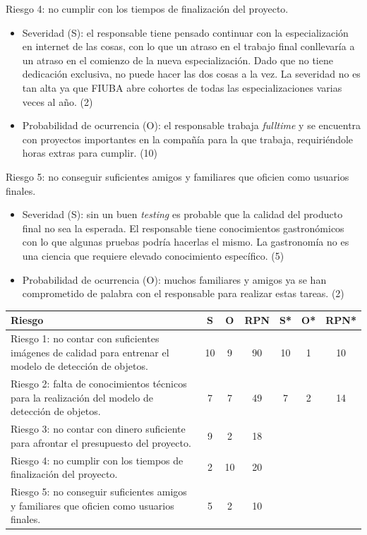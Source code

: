 \documentclass[
11pt, %
]{charter}
\begin{document}
Riesgo 4: no cumplir con los tiempos de finalización del proyecto.
\begin{itemize}
\item Severidad (S): el responsable tiene pensado continuar con la especialización en internet de las cosas, con lo que un atraso en el trabajo final conllevaría a un atraso en el comienzo de la nueva especialización. Dado que no tiene dedicación exclusiva, no puede hacer las dos cosas a la vez. La severidad no es tan alta ya que FIUBA abre cohortes de todas las especializaciones varias veces al año. (2)
\item Probabilidad de ocurrencia (O): el responsable trabaja \textit{fulltime} y se encuentra con proyectos importantes en la compañía para la que trabaja, requiriéndole horas extras para cumplir. (10)
\end{itemize}

Riesgo 5: no conseguir suficientes amigos y familiares que oficien como usuarios finales.
\begin{itemize}
\item Severidad (S): sin un buen \textit{testing} es probable que la calidad del producto final no sea la esperada. El responsable tiene conocimientos gastronómicos con lo que algunas pruebas podría hacerlas el mismo. La gastronomía no es una ciencia que requiere elevado conocimiento específico. (5)
\item Probabilidad de ocurrencia (O): muchos familiares y amigos ya se han comprometido de palabra con el responsable para realizar estas tareas. (2)
\end{itemize}



\begin{table}[htpb]
\centering
\begin{tabularx}{\linewidth}{@{}|X|c|c|c|c|c|c|@{}}
\hline
\rowcolor[HTML]{C0C0C0} 
Riesgo & S & O & RPN & S* & O* & RPN* \\ \hline
Riesgo 1: no contar con suficientes imágenes de calidad para entrenar el modelo de detección de objetos.      & 10   & 9  &  90   & 10   &  1  &   10   \\ \hline
Riesgo 2: falta de conocimientos técnicos para la realización del modelo de detección de objetos.     & 7  & 7  &  49   & 7   &  2  &    14  \\ \hline
Riesgo 3: no contar con dinero suficiente para afrontar el presupuesto del proyecto.       & 9  & 2  &   18  &    &    &      \\ \hline
Riesgo 4: no cumplir con los tiempos de finalización del proyecto.       &  2 & 10  &   20  &    &    &      \\ \hline
Riesgo 5: no conseguir suficientes amigos y familiares que oficien como usuarios finales.       & 5  &  2 &    10 &    &    &      \\ \hline
\end{tabularx}%
\end{table}
\end{document}
